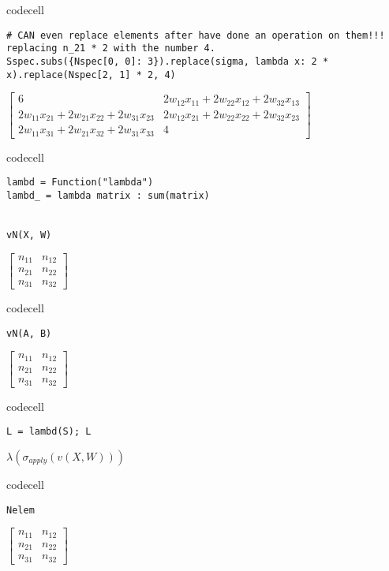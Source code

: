 codecell

\begin{verbatim}
# CAN even replace elements after have done an operation on them!!! replacing n_21 * 2 with the number 4.
Sspec.subs({Nspec[0, 0]: 3}).replace(sigma, lambda x: 2 * x).replace(Nspec[2, 1] * 2, 4)
\end{verbatim}

$\displaystyle \left[\begin{matrix}6 & 2 w_{12} x_{11} + 2 w_{22} x_{12} + 2 w_{32} x_{13}\\2 w_{11} x_{21} + 2 w_{21} x_{22} + 2 w_{31} x_{23} & 2 w_{12} x_{21} + 2 w_{22} x_{22} + 2 w_{32} x_{23}\\2 w_{11} x_{31} + 2 w_{21} x_{32} + 2 w_{31} x_{33} & 4\end{matrix}\right]$

codecell

\begin{verbatim}
lambd = Function("lambda")
lambd_ = lambda matrix : sum(matrix)


vN(X, W)
\end{verbatim}

$\displaystyle \left[\begin{matrix}n_{11} & n_{12}\\n_{21} & n_{22}\\n_{31} & n_{32}\end{matrix}\right]$

codecell

\begin{verbatim}
vN(A, B)
\end{verbatim}

$\displaystyle \left[\begin{matrix}n_{11} & n_{12}\\n_{21} & n_{22}\\n_{31} & n_{32}\end{matrix}\right]$

codecell

\begin{verbatim}
L = lambd(S); L
\end{verbatim}

$\displaystyle \lambda{\left(\sigma_{apply}{\left(v{\left(X,W \right)} \right)} \right)}$

codecell

\begin{verbatim}
Nelem
\end{verbatim}

$\displaystyle \left[\begin{matrix}n_{11} & n_{12}\\n_{21} & n_{22}\\n_{31} & n_{32}\end{matrix}\right]$

